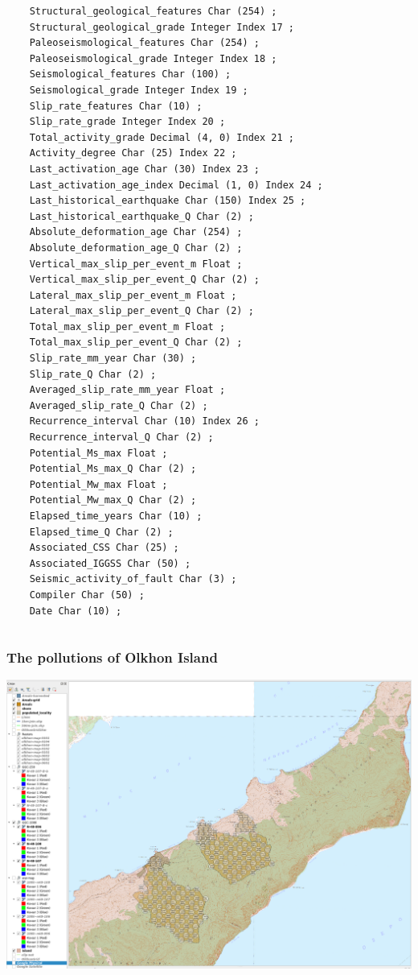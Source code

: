 \documentclass[10pt]{beamer}
\begin{document}
\begin{frame}[fragile]
\begin{columns}
\begin{column}{0.5\linewidth}
\begin{verbatim}
    Structural_geological_features Char (254) ;
    Structural_geological_grade Integer Index 17 ;
    Paleoseismological_features Char (254) ;
    Paleoseismological_grade Integer Index 18 ;
    Seismological_features Char (100) ;
    Seismological_grade Integer Index 19 ;
    Slip_rate_features Char (10) ;
    Slip_rate_grade Integer Index 20 ;
    Total_activity_grade Decimal (4, 0) Index 21 ;
    Activity_degree Char (25) Index 22 ;
    Last_activation_age Char (30) Index 23 ;
    Last_activation_age_index Decimal (1, 0) Index 24 ;
    Last_historical_earthquake Char (150) Index 25 ;
    Last_historical_earthquake_Q Char (2) ;
    Absolute_deformation_age Char (254) ;
    Absolute_deformation_age_Q Char (2) ;
    Vertical_max_slip_per_event_m Float ;
    Vertical_max_slip_per_event_Q Char (2) ;
    Lateral_max_slip_per_event_m Float ;
    Lateral_max_slip_per_event_Q Char (2) ;
    Total_max_slip_per_event_m Float ;
    Total_max_slip_per_event_Q Char (2) ;
    Slip_rate_mm_year Char (30) ;
    Slip_rate_Q Char (2) ;
    Averaged_slip_rate_mm_year Float ;
    Averaged_slip_rate_Q Char (2) ;
    Recurrence_interval Char (10) Index 26 ;
    Recurrence_interval_Q Char (2) ;
    Potential_Ms_max Float ;
    Potential_Ms_max_Q Char (2) ;
    Potential_Mw_max Float ;
    Potential_Mw_max_Q Char (2) ;
    Elapsed_time_years Char (10) ;
    Elapsed_time_Q Char (2) ;
    Associated_CSS Char (25) ;
    Associated_IGGSS Char (50) ;
    Seismic_activity_of_fault Char (3) ;
    Compiler Char (50) ;
    Date Char (10) ;
\end{verbatim}
    \end{column}
  \end{columns}
\end{frame}

\begin{frame}
  \frametitle{The pollutions of Olkhon Island}
  \centering
   \includegraphics[width=\linewidth]{olkhon-gis.png}
\end{frame}
\end{document}
